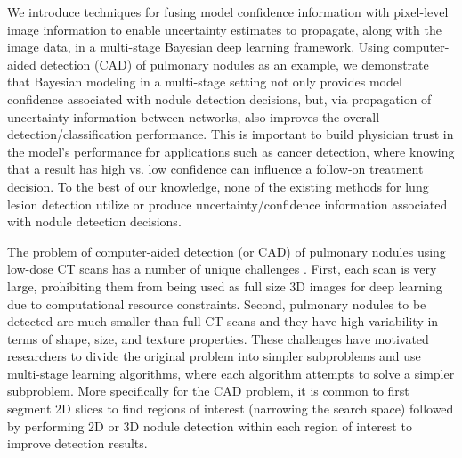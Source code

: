 \documentclass{article}
\begin{document}
We introduce techniques for fusing model confidence information with pixel-level image information to enable uncertainty estimates to propagate, along with the image data, in a multi-stage Bayesian deep learning framework. Using computer-aided detection (CAD) of pulmonary nodules as an example, we demonstrate that Bayesian modeling in a multi-stage setting not only provides model confidence associated with nodule detection decisions, but, via propagation of uncertainty information between networks, also improves the overall detection/classification performance. This is important to build physician trust in the model's performance for applications such as cancer detection, where knowing that a result has high vs. low confidence can influence a follow-on treatment decision. To the best of our knowledge, none of the existing methods for lung lesion detection \cite{ypsilantis_arxiv16, setio_mi16, roth_mi16, zhu_arxiv17, ding_arxiv17} utilize or produce uncertainty/confidence information associated with nodule detection decisions.


The problem of computer-aided detection (or CAD) of pulmonary nodules using low-dose CT scans has a number of unique challenges \cite{anode09, luna16}. First, each scan is very large, prohibiting them from being used as full size 3D images for deep learning due to computational resource constraints. Second, pulmonary nodules to be detected are much smaller than full CT scans and they have high variability in terms of shape, size, and texture properties. These challenges have motivated researchers to divide the original problem into simpler subproblems and use multi-stage learning algorithms, where each algorithm attempts to solve a simpler subproblem. More specifically for the CAD problem, it is common to first segment 2D slices to find regions of interest (narrowing the search space) followed by performing 2D or 3D nodule detection within each region of interest to improve detection results.
\end{document}
